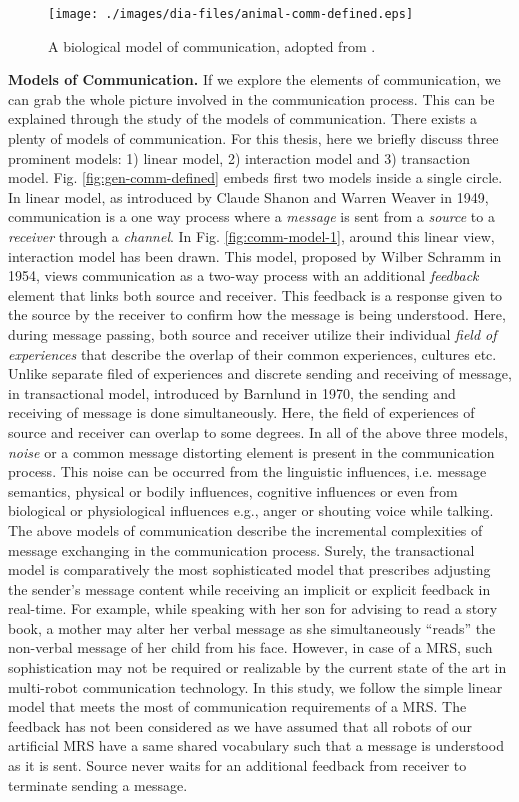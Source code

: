 \begin{figure}
\centering
\texttt{[image: ./images/dia-files/animal-comm-defined.eps]}
\caption{ A biological model of communication, adopted from \protect{}.}
\label{fig:bio-comm-defined} 
\end{figure}
\textbf{Models of Communication.} If we explore the elements of communication, we can grab the whole picture involved in the communication process. This can be explained through the study of the models  of communication. There exists a plenty of models of communication. For this thesis, here we briefly discuss three prominent models: 1) linear model, 2) interaction model and 3) transaction model. Fig. \ref{fig:gen-comm-defined} embeds first two models inside a single circle. In linear model, as introduced by Claude Shanon and Warren Weaver in 1949, communication is a one way process where a {\em message} is sent from a {\em source} to a {\em receiver} through a {\em channel}. In Fig. \ref{fig:comm-model-1}, around this linear view, interaction model has been drawn. This model, proposed by Wilber Schramm in 1954, views communication as a two-way process with an additional {\em feedback} element  that links both source and receiver. This feedback is a response given to the source by the receiver to confirm how the message is being understood. Here, during message passing, both source and receiver utilize their individual {\em field of experiences} that describe the overlap of their common experiences, cultures etc. Unlike separate filed of experiences and discrete sending and receiving of message, in transactional model, introduced by Barnlund in 1970, the sending and receiving of message is done simultaneously. Here, the  field of experiences of source and receiver can overlap to some degrees. In all of the above three models, {\em noise} or a common message distorting element is present in the communication process. This noise can be occurred from the linguistic influences, i.e. message semantics,  physical or bodily influences, cognitive influences or even from biological
or physiological influences e.g., anger or shouting voice while talking.\\ 
The above models of communication describe the incremental complexities of message exchanging in the communication process. Surely, the transactional model is comparatively the most sophisticated model that prescribes adjusting the sender's message content while receiving an implicit or explicit feedback in real-time. For example, while speaking with her son for advising to read a story book, a mother may alter her verbal message as she simultaneously ``reads'' the non-verbal message of her child from his face. However, in case of a MRS, such sophistication may not be required or realizable by the current state of the art in multi-robot communication technology. In this study, we follow the simple linear model that meets the most of communication requirements of a MRS. The feedback has not been considered as we have assumed that all robots of our artificial MRS have a same shared vocabulary such that a message is understood as it is sent. Source never waits for an additional feedback from receiver to terminate sending a message.\\
